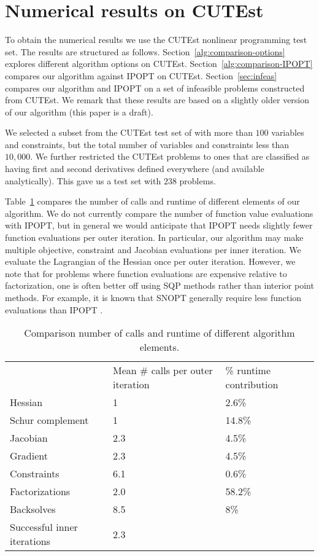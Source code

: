 \documentclass{article}
\begin{document}
\section{Numerical results on CUTEst}\label{sec:numerical-results}

To obtain the numerical results we use the CUTEst nonlinear programming test set. The results are structured as follows. Section~\ref{alg:comparison-options} explores different algorithm options on CUTEst.  Section~\ref{alg:comparison-IPOPT} compares our algorithm against IPOPT on CUTEst. Section~\ref{sec:infeas} compares our algorithm and IPOPT on a set of infeasible problems constructed from CUTEst. We remark that these results are based on a slightly older version of our algorithm (this paper is a draft).

We selected a subset from the CUTEst test set of with more than $100$ variables and constraints, but the total number of variables and constraints less than $10,000$. We further restricted the CUTEst problems to ones that are classified as having first and second derivatives defined everywhere (and available analytically). This gave us a test set with $238$ problems.

Table~\ref{avg:evaluations} compares the number of calls and runtime of different elements of our algorithm. We do not currently compare the number of function value evaluations with IPOPT, but in general we would anticipate that IPOPT needs slightly fewer function evaluations per outer iteration. In particular, our algorithm may make multiple objective, constraint and Jacobian evaluations per inner iteration. We evaluate the Lagrangian of the Hessian once per outer iteration. However, we note that for problems where function evaluations are expensive relative to factorization, one is often better off using SQP methods rather than interior point methods. For example, it is known that SNOPT generally require less function evaluations than IPOPT \cite[Figure 2, Figure 3]{gill2015performance}. 


\begin{table}[H]
\begin{tabular}{l  p{3.0cm} l}
&   Mean \# calls per outer iteration & \% runtime contribution \\ 
Hessian & 1 & 2.6\% \\  
Schur complement &1 & 14.8\% \\
Jacobian & 2.3 & 4.5\%  \\
Gradient & 2.3 & 4.5\%  \\
Constraints & 6.1 & 0.6\% \\
Factorizations & 2.0  & 58.2\%  \\
Backsolves & 8.5 & 8\% \\
Successful inner iterations & 2.3 & \\
\end{tabular}
\caption{Comparison number of calls and runtime of different algorithm elements.}\label{avg:evaluations}
\end{table}
\end{document}
